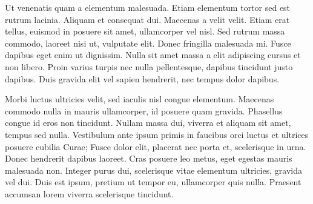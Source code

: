 Ut venenatis quam a elementum malesuada. Etiam elementum tortor sed est rutrum lacinia. Aliquam et consequat dui. Maecenas a velit velit. Etiam erat tellus, euismod in posuere sit amet, ullamcorper vel nisl. Sed rutrum massa commodo, laoreet nisi ut, vulputate elit. Donec fringilla malesuada mi. Fusce dapibus eget enim ut dignissim. Nulla sit amet massa a elit adipiscing cursus et non libero. Proin varius turpis nec nulla pellentesque, dapibus tincidunt justo dapibus. Duis gravida elit vel sapien hendrerit, nec tempus dolor dapibus.

Morbi luctus ultricies velit, sed iaculis nisl congue elementum. Maecenas commodo nulla in mauris ullamcorper, id posuere quam gravida. Phasellus congue id eros non tincidunt. Nullam massa dui, viverra et aliquam sit amet, tempus sed nulla. Vestibulum ante ipsum primis in faucibus orci luctus et ultrices posuere cubilia Curae; Fusce dolor elit, placerat nec porta et, scelerisque in urna. Donec hendrerit dapibus laoreet. Cras posuere leo metus, eget egestas mauris malesuada non. Integer purus dui, scelerisque vitae elementum ultricies, gravida vel dui. Duis est ipsum, pretium ut tempor eu, ullamcorper quis nulla. Praesent accumsan lorem viverra scelerisque tincidunt.